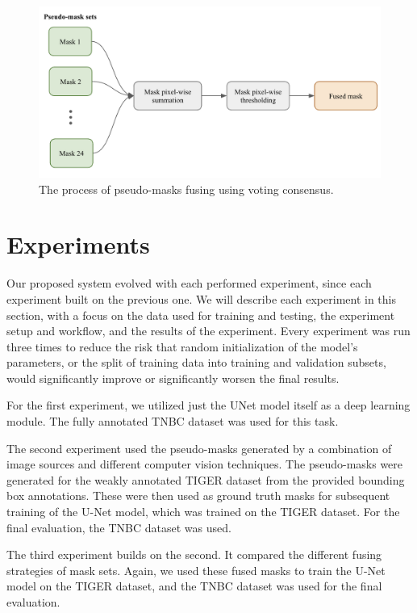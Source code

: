 \begin{figure}[H]
\begin{centering}
\includegraphics[width=\textwidth]{assets/images/for_presentation/dg-mask-fuse-1.png}
\par\end{centering}
\caption{The process of pseudo-masks fusing using voting consensus. 
\label{fig:dg-mask-fuse-1}}
\end{figure}

\section{Experiments}
\label{section:experiments}
Our proposed system evolved with each performed experiment, since each experiment built on the previous one. We will describe each experiment in this section, with a focus on the data used for training and testing, the experiment setup and workflow, and the results of the experiment. Every experiment was run three times to reduce the risk that random initialization of the model's parameters, or the split of training data into training and validation subsets, would significantly improve or significantly worsen the final results.

For the first experiment, we utilized just the UNet model itself as a deep learning module. The fully annotated TNBC dataset was used for this task.

The second experiment used the pseudo-masks generated by a combination of image sources and different computer vision techniques. The pseudo-masks were generated for the weakly annotated TIGER dataset from the provided bounding box annotations. These were then used as ground truth masks for subsequent training of the U-Net model, which was trained on the TIGER dataset. For the final evaluation, the TNBC dataset was used.

The third experiment builds on the second. It compared the different fusing strategies of mask sets. Again, we used these fused masks to train the U-Net model on the TIGER dataset, and the TNBC dataset was used for the final evaluation.

